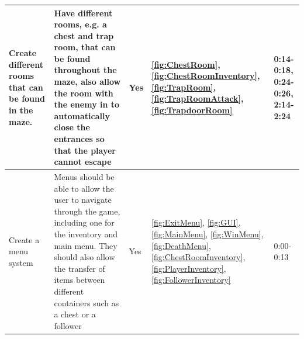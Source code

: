 \documentclass[../Main.tex]{subfiles}
\begin{document}
\begin{center}
\begin{tabular}{ | m{} | m{} | m{} | m{} | m{}| }
                    \hline
                    Create different rooms that can be found in the maze. &  Have different rooms, e.g. a chest and trap room, that can be found throughout the maze, also allow the room with the enemy in to automatically close the entrances so that the player cannot escape & Yes & \ref{fig:ChestRoom}, \ref{fig:ChestRoomInventory}, \ref{fig:TrapRoom}, \ref{fig:TrapRoomAttack}, \ref{fig:TrapdoorRoom} & 0:14-0:18, 0:24-0:26, 2:14-2:24 \\
                    \hline
                    Create a menu system & Menus should be able to allow the user to navigate through the game, including one for the inventory and main menu. They should also allow the transfer of items between different containers such as a chest or a follower & Yes & \ref{fig:ExitMenu}, \ref{fig:GUI}, \ref{fig:MainMenu}, \ref{fig:WinMenu}, \ref{fig:DeathMenu}, \ref{fig:ChestRoomInventory}, \ref{fig:PlayerInventory}, \ref{fig:FollowerInventory} & 0:00-0:13 \\
                    \hline
                \end{tabular}
            \end{center}
\end{document}
